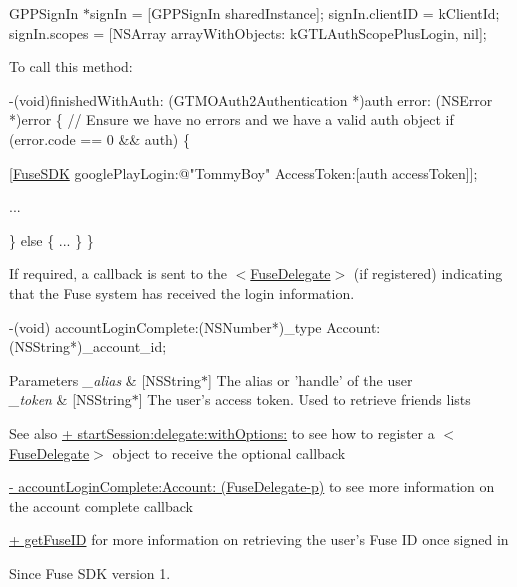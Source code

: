 G\+P\+P\+Sign\+In $\ast$sign\+In = \mbox{[}G\+P\+P\+Sign\+In shared\+Instance\mbox{]}; sign\+In.\+client\+I\+D = k\+Client\+Id; sign\+In.\+scopes = \mbox{[}N\+S\+Array array\+With\+Objects\+: k\+G\+T\+L\+Auth\+Scope\+Plus\+Login, nil\mbox{]};

To call this method\+:


\begin{DoxyCode}
-(void)finishedWithAuth: (GTMOAuth2Authentication *)auth error: (NSError *)error
\{
   \textcolor{comment}{// Ensure we have no errors and we have a valid auth object}
   \textcolor{keywordflow}{if} (error.code == 0 && auth) \{

   [\hyperlink{interface_fuse_s_d_k}{FuseSDK} googlePlayLogin:\textcolor{stringliteral}{@"TommyBoy"} AccessToken:[auth accessToken]];

   ...

   \} \textcolor{keywordflow}{else} \{
   ...
   \}
\}
\end{DoxyCode}


If required, a callback is sent to the $<$\hyperlink{protocol_fuse_delegate-p}{Fuse\+Delegate}$>$ (if registered) indicating that the Fuse system has received the login information.


\begin{DoxyCode}
-(void) accountLoginComplete:(NSNumber*)\_type Account:(NSString*)\_account\_id;
\end{DoxyCode}



\begin{DoxyParams}{Parameters}
{\em \+\_\+alias} & \mbox{[}N\+S\+String$\ast$\mbox{]} The alias or 'handle' of the user \\
\hline
{\em \+\_\+token} & \mbox{[}N\+S\+String$\ast$\mbox{]} The user's access token. Used to retrieve friends lists \\
\hline
\end{DoxyParams}
\begin{DoxySeeAlso}{See also}
\hyperlink{interface_fuse_s_d_k_adf7ed64a02b9540c9ded4b931ea4e400}{+ start\+Session\+:delegate\+:with\+Options\+:} to see how to register a $<$\hyperlink{protocol_fuse_delegate-p}{Fuse\+Delegate}$>$ object to receive the optional callback 

\hyperlink{protocol_fuse_delegate-p_a54a18530604a7ceeb0e9419fc7fa3345}{-\/ account\+Login\+Complete\+:\+Account\+: (\+Fuse\+Delegate-\/p)} to see more information on the account complete callback 

\hyperlink{interface_fuse_s_d_k_ab483c2a3f4439aad8e19200cf24ff731}{+ get\+Fuse\+I\+D} for more information on retrieving the user's Fuse I\+D once signed in 
\end{DoxySeeAlso}
\begin{DoxySince}{Since}
Fuse S\+D\+K version 1. 
\end{DoxySince}
\hypertarget{interface_fuse_s_d_k_abdf624c4ef56ee1c7cac73b37dc4f5fd}{}

